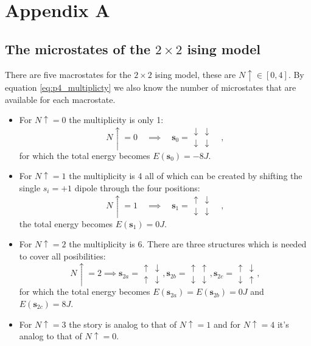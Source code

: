 \documentclass[../main_proj4_correct_template.tex]{subfiles}
\begin{document}
\onecolumngrid
\appendix
\section{Appendix A}\label{app:p4_AppendixA}

\subsection{The microstates of the $2\times 2$ ising model}\label{app:p4_AppendixA_microstates}

There are five macrostates for the $2\times 2$ ising model, these are $N\uparrow \in[0, 4]$. By equation \eqref{eq:p4_multiplicty} we also know the number of microstates that are available for each macrostate.

\begin{itemize}
    \item For $N\uparrow=0$ the multiplicity is only 1:
$$
N \uparrow= 0 
\quad \implies \quad
\mathbf{s}_0 = 
\begin{matrix}
    \downarrow & \downarrow \\
    \downarrow & \downarrow 
\end{matrix} \quad,
$$
for which the total energy becomes $E(\mathbf{s}_0)= - 8 J$. 
\item For $N\uparrow=1$ the multiplicity is 4 all of which can be created by shifting the single $s_i=+1$ dipole through the four positions:
$$
N \uparrow= 1 
\quad \implies \quad
\mathbf{s}_1 = 
\begin{matrix}
    \uparrow & \downarrow \\
    \downarrow & \downarrow 
\end{matrix} \quad,
$$
the total energy becomes $E(\mathbf{s}_1)= 0 J$. 
\item For $N\uparrow=2$ the multiplicity is 6. There are three structures which is needed to cover all posibilities:
$$
N \uparrow= 2
\implies
\mathbf{s}_{2a} = 
\begin{matrix}
    \uparrow & \downarrow \\
    \uparrow & \downarrow 
\end{matrix}, \mathbf{s}_{2b} = 
\begin{matrix}
    \uparrow & \uparrow \\
    \downarrow & \downarrow 
\end{matrix}, \mathbf{s}_{2c} = 
\begin{matrix}
    \uparrow & \downarrow \\
    \downarrow & \uparrow 
\end{matrix},
$$
for which the total energy becomes $E(\mathbf{s}_{2a})= E(\mathbf{s}_{2b})=0 J$ and $E(\mathbf{s}_{2c}) = 8J$.
\item For $N\uparrow=3$ the story is analog to that of $N\uparrow=1$ and for $N\uparrow=4$ it's analog to that of $N\uparrow=0$.
\end{itemize}
\end{document}
